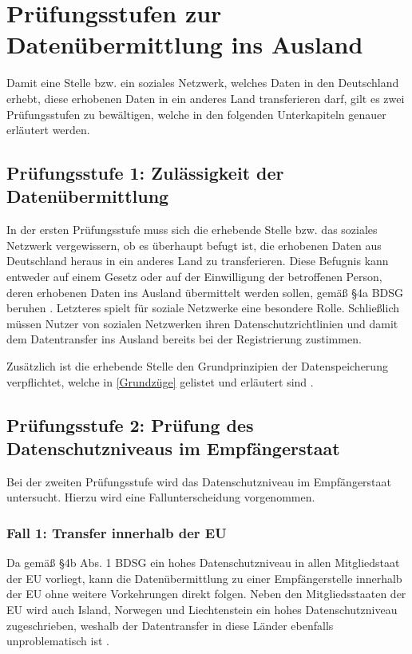 \section{Prüfungsstufen zur Datenübermittlung ins Ausland}
Damit eine Stelle bzw. ein soziales Netzwerk, welches Daten in den Deutschland erhebt, diese erhobenen Daten in ein anderes Land transferieren darf, gilt es zwei Prüfungsstufen zu bewältigen, welche in den folgenden Unterkapiteln genauer erläutert werden.

\subsection{Prüfungsstufe 1: Zulässigkeit der Datenübermittlung}
In der ersten Prüfungsstufe muss sich die erhebende Stelle bzw. das soziales Netzwerk vergewissern, ob es überhaupt befugt ist, die erhobenen Daten aus Deutschland heraus in ein anderes Land zu transferieren. Diese Befugnis kann entweder auf einem Gesetz oder auf der Einwilligung der betroffenen Person, deren erhobenen Daten ins Ausland übermittelt werden sollen, gemäß §4a BDSG beruhen \autocite[vgl.][]{LDI.2017}. Letzteres spielt für soziale Netzwerke eine besondere Rolle. Schließlich müssen Nutzer von sozialen Netzwerken ihren Datenschutzrichtlinien und damit dem Datentransfer ins Ausland bereits bei der Registrierung zustimmen.
\par
Zusätzlich ist die erhebende Stelle den Grundprinzipien der Datenspeicherung verpflichtet, welche in \vref{Grundzüge} gelistet und erläutert sind \autocite[vgl.][]{LDI.2017}.

\subsection{Prüfungsstufe 2: Prüfung des Datenschutzniveaus im Empfängerstaat}
Bei der zweiten Prüfungsstufe wird das Datenschutzniveau im Empfängerstaat untersucht. Hierzu wird eine Fallunterscheidung vorgenommen.

\subsubsection{Fall 1: Transfer innerhalb der EU}
Da gemäß §4b Abs. 1 BDSG ein hohes Datenschutzniveau in allen Mitgliedstaat der \acl{EU} vorliegt, kann die Datenübermittlung zu einer Empfängerstelle innerhalb der \acl{EU} ohne weitere Vorkehrungen direkt folgen. Neben den Mitgliedsstaaten der \ac{EU} wird auch Island, Norwegen und Liechtenstein ein hohes Datenschutzniveau zugeschrieben, weshalb der Datentransfer in diese Länder ebenfalls unproblematisch ist \autocite[vgl.][]{LDI.2017}.

